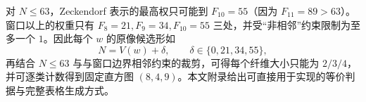\begin{remark}
对 $N\le 63$，Zeckendorf 表示的最高权只可能到 $F_{10}=55$（因为 $F_{11}=89>63$）。窗口以上的权重只有 $F_8=21,F_9=34,F_{10}=55$ 三处，并受“非相邻”约束限制为至多一个 $1$。因此每个 $w$ 的原像候选形如
$$
N=V(w)+\delta,\qquad \delta\in\{0,21,34,55\},
$$
再结合 $N\le 63$ 与与窗口边界相邻约束的裁剪，可得每个纤维大小只能为 $2/3/4$，并可逐类计数得到固定直方图 $(8,4,9)$。本文附录给出可直接用于实现的等价判据与完整表格生成方式。
\end{remark}

